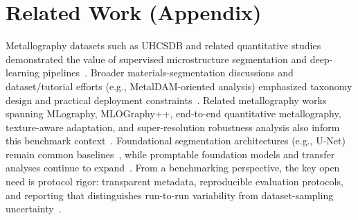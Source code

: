 \documentclass{article}
\begin{document}



\appendix

\section{Related Work (Appendix)}\label{app:related}
Metallography datasets such as UHCSDB and related quantitative studies demonstrated the value of supervised microstructure segmentation and deep-learning pipelines~\citep{decost2017uhcsdb,decost2019high}. Broader materials-segmentation discussions and dataset/tutorial efforts (e.g., MetalDAM-oriented analysis) emphasized taxonomy design and practical deployment constraints~\citep{luengo2022tutorial}. Related metallography works spanning MLography, MLOGraphy++, end-to-end quantitative metallography, texture-aware adaptation, and super-resolution robustness analysis also inform this benchmark context~\citep{rusanovsky2020mlography,cohen2024mlographypp,rusanovsky2022end,rusanovsky2025texturesam,meivar2025srtbm}. Foundational segmentation architectures (e.g., U-Net) remain common baselines~\citep{ronneberger2015u}, while promptable foundation models and transfer analyses continue to expand~\citep{kirillov2023segment,ji2023segment}. From a benchmarking perspective, the key open need is protocol rigor: transparent metadata, reproducible evaluation protocols, and reporting that distinguishes run-to-run variability from dataset-sampling uncertainty~\citep{ramprasad2017machine}.
\end{document}
